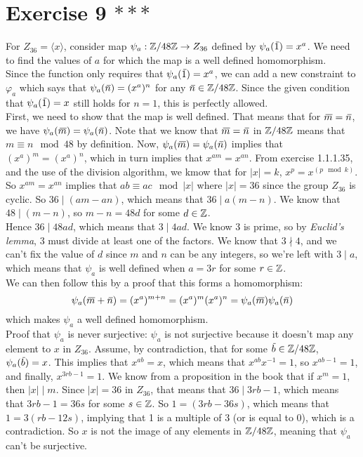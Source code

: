 \documentclass[12pt]{article}
\begin{document}
    \section*{Exercise 9 $***$}
    For $Z_{36} = \langle x \rangle$,
    consider map $\psi_a: \mathbb{Z}/48\mathbb{Z} \to Z_{36}$
    defined by $\psi_a(\,\overline{\!{1}}) = x^a$.
    We need to find the values of $a$ for which the map is a well
    defined homomorphism. \\
    Since the function only requires that $\psi_a(\,\overline{\!{1}}) = x^a$,
    we can add a new constraint to $\varphi_a$ which says that 
    $\psi_a(\,\overline{\!{n}}) = (x^a)^n$ for any $\,\overline{\!{n}} \in \mathbb{Z}/48\mathbb{Z}$.
    Since the given condition that $\psi_a(\,\overline{\!{1}}) = x$
    still holds for $n = 1$, this is perfectly allowed. \\
    First, we need to show that the map is well defined.
    That means that for $\,\overline{\!{m}} = \,\overline{\!{n}}$,
    we have $\psi_a(\,\overline{\!{m}}) = \psi_a(\,\overline{\!{n}})$.
    Note that we know that $\,\overline{\!{m}} = \,\overline{\!{n}}$ in $\mathbb{Z}/48\mathbb{Z}$
    means that $m \equiv n \mod 48$ by definition.
    Now, $\psi_a(\,\overline{\!{m}}) = \psi_a(\,\overline{\!{n}})$
    implies that $(x^a)^m = (x^a)^n$,
    which in turn implies that $x^{am} = x^{an}$.
    From exercise 1.1.1.35, and the use of the division
    algorithm, we kmow that for $|x| = k$, $x^p = x^{(p \mod k)}$.
    So $x^{am} = x^{an}$ implies that $ab \equiv ac \mod |x|$
    where $|x| = 36$ since the group $Z_{36}$ is cyclic.
    So $36 \mid (am - an)$,
    which means that $36 \mid a(m - n)$.
    We know that $48 \mid (m - n)$,
    so $m - n = 48d$ for some $d \in \mathbb{Z}$. \\
    Hence $36 \mid 48ad$,
    which means that $3 \mid 4ad$.
    We know 3 is prime, so by \textit{Euclid's lemma},
    3 must divide at least one of the factors.
    We know that $3 \nmid 4$,
    and we can't fix the value of $d$ since $m$ and $n$
    can be any integers,
    so we're left with $3 \mid a$,
    which means that $\psi_a$ is well defined when
    $a = 3r$ for some $r \in \mathbb{Z}$. \\
    We can then follow this by a proof that this forms a homomorphism:
    \[ \psi_a(\,\overline{\!{m}} + \,\overline{\!{n}}) = (x^a)^{m + n}
    = (x^a)^m(x^a)^n
    = \psi_a(\,\overline{\!{m}})\psi_a(\,\overline{\!{n}})  \]
    which makes $\psi_a$ a well defined homomorphism. \\
    Proof that $\psi_a$ is never surjective:
    $\psi_a$ is not surjective because it doesn't map any element
    to $x$ in $Z_{36}$.
    Assume, by contradiction, that for some $\,\overline{\!{b}} \in \mathbb{Z}/48\mathbb{Z}$,
    $\psi_a(\,\overline{\!{b}}) = x$.
    This implies that $x^{ab} = x$,
    which means that $x^{ab}x^{-1} = 1$,
    so $x^{ab - 1} = 1$,
    and finally, $x^{3rb - 1} = 1$.
    We know from a proposition in the book that
    if $x^m = 1$, then $|x| \mid m$.
    Since $|x| = 36$ in $Z_{36}$,
    that means that $36 \mid 3rb - 1$,
    which means that $3rb - 1 = 36s$ for some $s \in \mathbb{Z}$.
    So $1 = (3rb - 36s)$,
    which means that $1 = 3(rb - 12s)$,
    implying that 1 is a multiple of 3 (or is equal to 0),
    which is a contradiction.
    So $x$ is not the image of any elements in $\mathbb{Z}/48\mathbb{Z}$,
    meaning that $\psi_a$ can't be surjective.
\end{document}
